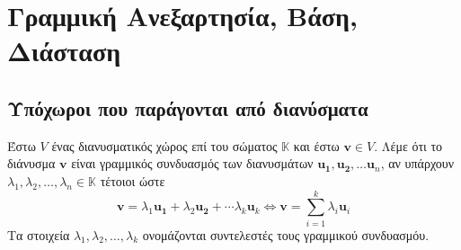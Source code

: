




\let\vec\mathbf

\pagestyle{vangelis}




\chapter{Γραμμική Ανεξαρτησία, Βάση, Διάσταση}

\section{Υπόχωροι που παράγονται από διανύσματα}

\begin{dfn}
    Έστω $ V $ ένας διανυσματικός χώρος επί του σώματος $ \mathbb{K} $ και έστω 
    $ \mathbf{v} \in V $. Λέμε ότι το διάνυσμα $ \mathbf{v}$ είναι 
    \textcolor{Col2}{γραμμικός συνδυασμός} των διανυσμάτων 
    $ \mathbf{u_{1}}, \mathbf{u_{2}}, \ldots \mathbf{u}_{n} $, αν υπάρχουν 
    $ \lambda _{1}, \lambda _{2}, \ldots, \lambda _{n} \in \mathbb{K} $ τέτοιοι ώστε 
    \[
        \mathbf{v} = \lambda _{1} \mathbf{u_{1}}+ \lambda_{2} \mathbf{u_{2}}+ 
        \cdots \lambda _{k} \mathbf{u}_{k} \Leftrightarrow \mathbf{v} = 
        \sum_{i=1}^{k} \lambda _{i} \mathbf{u}_{i} 
    \]
    Τα στοιχεία $ \lambda _{1}, \lambda _{2}, \ldots, \lambda _{k} $ ονομάζονται 
    \textcolor{Col2}{συντελεστές} τους γραμμικού συνδυασμόυ.
\end{dfn}

